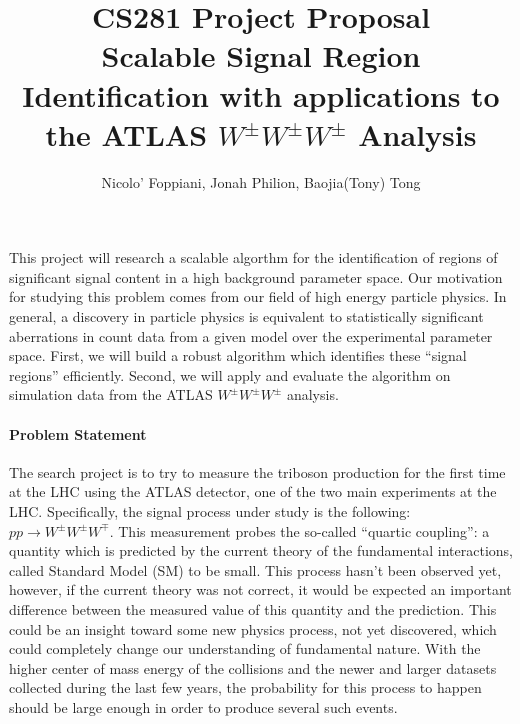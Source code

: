 \documentclass[11pt]{article}
\title{CS281 Project Proposal \\
	\large Scalable Signal Region Identification with applications to the ATLAS $W^\pm W^\pm W^\pm$ Analysis}
\author{Nicolo' Foppiani, Jonah Philion, Baojia(Tony) Tong}
\date{}                                           %
\begin{document}
\maketitle

\paragraph{}
This project will research a scalable algorthm for the identification of regions of significant signal content in a high background parameter space. Our motivation for studying this problem comes from our field of high energy particle physics. In general, a discovery in particle physics is equivalent to statistically significant aberrations in count data from a given model over the experimental parameter space. First, we will build a robust algorithm which identifies these ``signal regions'' efficiently. Second, we will apply and evaluate the algorithm on simulation data from the ATLAS $W^\pm W^\pm W^\pm$ analysis.

\paragraph{Problem Statement}
The search project is to try to measure the triboson production for the first time at the LHC using the ATLAS detector, one of the two main experiments at the LHC. Specifically, the signal process under study is the following: $pp \rightarrow W^{\pm}W^{\pm}W^{\mp}$. 
This measurement probes the so-called ``quartic coupling'': a quantity which is predicted by the current theory of the fundamental interactions, called Standard Model (SM) to be small. This process hasn't been observed yet, however, if the current theory was not correct, it would be expected an important difference between the measured value of this quantity and the prediction. This could be an insight toward some new physics process, not yet discovered, which could completely change our understanding of fundamental nature. With the higher center of mass energy of the collisions and the newer and larger datasets collected during the last few years, the probability for this process to happen should be large enough in order to produce several such events.
\end{document}
